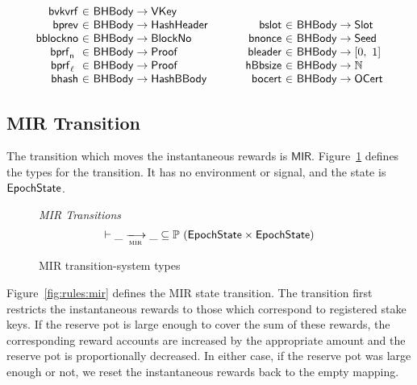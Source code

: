 \begin{figure*}[htb]
\begin{equation*}
\begin{array}{r@{~\in~}l@{~~~~~~~~~~}r@{~\in~}lr}
      \fun{bvkvrf} & \BHBody \to \VKey \\
      \fun{bprev} & \BHBody \to \HashHeader &
      \fun{bslot} & \BHBody \to \Slot \\
      \fun{bblockno} & \BHBody \to \BlockNo &
      \fun{bnonce} & \BHBody \to \Seed \\
      \fun{\bprfn{}} & \BHBody \to \Proof &
      \fun{bleader} & \BHBody \to \unitInterval \\
      \fun{\bprfl{}} & \BHBody \to \Proof &
      \fun{hBbsize} & \BHBody \to \N \\
      \fun{bhash} & \BHBody \to \HashBBody &
      \fun{bocert} & \BHBody \to \OCert \\
    \end{array}
  \end{equation*}
  \caption{Block Definitions}
  \label{fig:defs:blocks}
\end{figure*}

\clearpage

\subsection{MIR Transition}
\label{sec:mir-trans}

The transition which moves the instantaneous rewards is $\mathsf{MIR}$.
Figure~\ref{fig:ts-types:mir} defines the types for the transition.
It has no environment or signal, and the state is $\mathsf{EpochState}$.

\begin{figure}
  \emph{MIR Transitions}
  \begin{equation*}
    \vdash \var{\_} \trans{mir}{} \var{\_} \subseteq
    \powerset (\EpochState \times \EpochState)
  \end{equation*}
  \caption{MIR transition-system types}
  \label{fig:ts-types:mir}
\end{figure}

Figure~\ref{fig:rules:mir} defines the MIR state transition.
The transition first restricts the instantaneous rewards to those which
correspond to registered stake keys.
If the reserve pot is large enough to cover the sum of these rewards,
the corresponding reward accounts are increased by the appropriate amount
and the reserve pot is proportionally decreased.
In either case, if the reserve pot was large enough or not,
we reset the instantaneous rewards back to the empty mapping.

